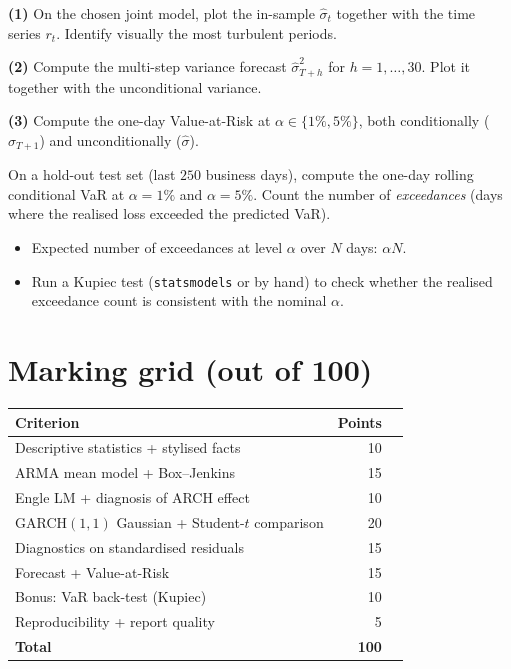 \documentclass[a4paper,11pt]{article}
\begin{document}
\begin{exercise}
\textbf{(1)} On the chosen joint model, plot the in-sample
$\widehat\sigma_t$ together with the time series $r_t$. Identify
visually the most turbulent periods.

\textbf{(2)} Compute the multi-step variance forecast
$\widehat\sigma_{T+h}^2$ for $h = 1, \dots, 30$. Plot it together
with the unconditional variance.

\textbf{(3)} Compute the one-day Value-at-Risk at $\alpha \in
\{1\%, 5\%\}$, both conditionally
($\widehat\sigma_{T+1}$) and unconditionally
($\widehat\sigma$).
\end{exercise}

\begin{exercise}
On a hold-out test set (last $250$ business days), compute the
one-day rolling conditional VaR at $\alpha = 1\%$ and $\alpha =
5\%$. Count the number of \emph{exceedances} (days where the
realised loss exceeded the predicted VaR).
\begin{itemize}
  \item Expected number of exceedances at level $\alpha$ over $N$
        days: $\alpha N$.
  \item Run a Kupiec test (\texttt{statsmodels} or by hand) to
        check whether the realised exceedance count is consistent
        with the nominal $\alpha$.
\end{itemize}
\end{exercise}

\section*{Marking grid (out of 100)}

\begin{center}
\begin{tabular}{p{8cm}rl}
\toprule
\textbf{Criterion} & \textbf{Points} & \\
\midrule
Descriptive statistics + stylised facts             & 10 \\
ARMA mean model + Box--Jenkins                      & 15 \\
Engle LM + diagnosis of ARCH effect                 & 10 \\
GARCH$(1, 1)$ Gaussian + Student-$t$ comparison     & 20 \\
Diagnostics on standardised residuals               & 15 \\
Forecast + Value-at-Risk                            & 15 \\
Bonus: VaR back-test (Kupiec)                       & 10 \\
Reproducibility + report quality                    &  5 \\
\midrule
\textbf{Total}                                      & \textbf{100} \\
\bottomrule
\end{tabular}
\end{center}

\bigskip
\hfill\auteurNom\par
\hfill\auteurEmail\par
\end{document}
